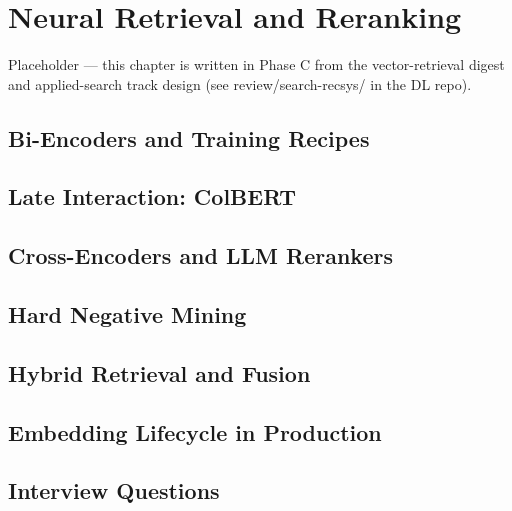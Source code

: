 \chapter{Neural Retrieval and Reranking}
\label{sr:chap:neural_retrieval_reranking}

\begin{tldr}
Placeholder — this chapter is written in Phase C from the vector-retrieval digest and applied-search track design (see review/search-recsys/ in the DL repo).
\end{tldr}

\section{Bi-Encoders and Training Recipes}

\section{Late Interaction: ColBERT}

\section{Cross-Encoders and LLM Rerankers}

\section{Hard Negative Mining}

\section{Hybrid Retrieval and Fusion}

\section{Embedding Lifecycle in Production}

\section{Interview Questions}

